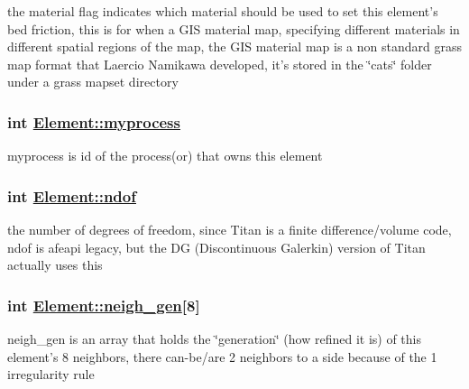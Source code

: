 the material flag indicates which material should be used to set this element's bed friction, this is for when a GIS material map, specifying different materials in different spatial regions of the map, the GIS material map is a non standard grass map format that Laercio Namikawa developed, it's stored in the \char`\"{}cats\char`\"{} folder under a grass mapset directory 

\hypertarget{classElement_r0}{
\subsubsection[myprocess]{\setlength{\rightskip}{0pt plus 5cm}int \hyperlink{classElement_r0}{Element::myprocess}}}
\label{classElement_r0}


myprocess is id of the process(or) that owns this element 

\hypertarget{classElement_r15}{
\subsubsection[ndof]{\setlength{\rightskip}{0pt plus 5cm}int \hyperlink{classElement_r15}{Element::ndof}}}
\label{classElement_r15}


the number of degrees of freedom, since Titan is a finite difference/volume code, ndof is afeapi legacy, but the DG (Discontinuous Galerkin) version of Titan actually uses this 

\hypertarget{classElement_r13}{
\subsubsection[neigh\_\-gen]{\setlength{\rightskip}{0pt plus 5cm}int \hyperlink{classElement_r13}{Element::neigh\_\-gen}\mbox{[}8\mbox{]}}}
\label{classElement_r13}


neigh\_\-gen is an array that holds the \char`\"{}generation\char`\"{} (how refined it is) of this element's 8 neighbors, there can-be/are 2 neighbors to a side because of the 1 irregularity rule 

